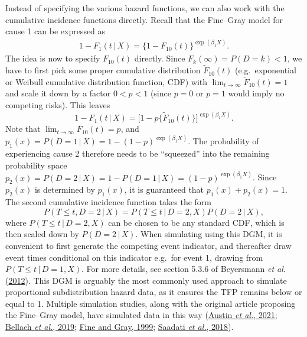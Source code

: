 \documentclass[
  letterpaper,
  DIV=11,
  numbers=noendperiod]{scrreprt}
\newcommand{\given}{\,|\,}
\begin{document}
Instead of specifying the various hazard functions, we can also work
with the cumulative incidence functions directly. Recall that the
Fine--Gray model for cause 1 can be expressed as \begin{align*}
    1 - F_1(t \given X) = \{1 - F_{10}(t)\}^{\exp(\beta_1 X)}.
\end{align*} The idea is now to specify \(F_{10}(t)\) directly. Since
\(F_k(\infty)=P(D=k)<1\), we have to first pick some proper cumulative
distribution \(\tilde{F}_{10}(t)\) (e.g.~exponential or Weibull
cumulative distribution function, CDF) with
\(\lim_{t \to \infty}\tilde{F}_{10}(t) = 1\) and scale it down by a
factor \(0< p < 1\) (since \(p = 0\) or \(p = 1\) would imply no
competing risks). This leaves \begin{equation*}
    1 - F_1(t \given X) = \big[1-p\{ \tilde{F}_{10}(t) \}\big]^{\exp(\beta_1 X)}.
\end{equation*} Note that \(\lim_{t \to \infty}F_{10}(t) = p\), and
\(p_1(x) = P(D = 1 \given X) = 1 - (1-p)^{\exp(\beta_1 X)}\). The
probability of experiencing cause 2 therefore needs to be ``squeezed''
into the remaining probability space
\(p_2(x) = P(D = 2 \given X) = 1 - P(D = 1 \given X) = (1-p)^{\exp(\beta_1 X)}\).
Since \(p_2(x)\) is determined by \(p_1(x)\), it is guaranteed that
\(p_1(x) + p_2(x) = 1\). The second cumulative incidence function takes
the form \begin{equation*}
    P(T \leq t, D=2 \given X) = P(T \leq t \given D=2, X)P(D = 2 \given X),
\end{equation*} where \(P(T \leq t \given D=2, X)\) can be chosen to be
any standard CDF, which is then scaled down by \(P(D = 2 \given X)\).
When simulating using this DGM, it is convenient to first generate the
competing event indicator, and thereafter draw event times conditional
on this indicator e.g.~for event 1, drawing from
\(P(T \leq t \given D=1, X)\). For more details, see section 5.3.6 of
Beyersmann \emph{et al.}
(\protect\hyperlink{ref-beyersmannCompetingRisksMultistate2012}{2012}).
This DGM is arguably the most commonly used approach to simulate
proportional subdistribution hazard data, as it ensures the TFP remains
below or equal to 1. Multiple simulation studies, along with the
original article proposing the Fine--Gray model, have simulated data in
this way
(\protect\hyperlink{ref-austinFineGraySubdistributionHazard2021}{Austin
\emph{et al.}, 2021};
\protect\hyperlink{ref-bellachWeightedNPMLESubdistribution2019}{Bellach
\emph{et al.}, 2019};
\protect\hyperlink{ref-fineProportionalHazardsModel1999}{Fine and Gray,
1999};
\protect\hyperlink{ref-saadatiPredictionAccuracyVariable2018}{Saadati
\emph{et al.}, 2018}).
\end{document}

